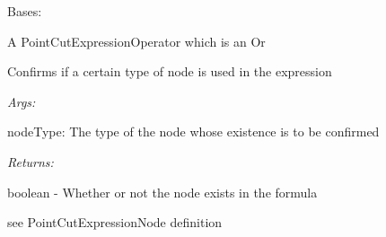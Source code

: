 \documentclass[letterpaper,10pt,english]{sphinxmanual}
\begin{document}
\begin{fulllineitems}
\label{modules/index:aosb.core.PointCutExpressionOr}
Bases: {\hyperref[modules/index:aosb.core.PointCutExpressionOperator]{}}

A PointCutExpressionOperator which is an Or

\begin{fulllineitems}
\label{modules/index:aosb.core.PointCutExpressionOr.expressionUses}
Confirms if a certain type of node is used in the expression

\begin{DUlineblock}{0em}
\item[] \emph{Args:}
\item[]
\begin{DUlineblock}{\DUlineblockindent}
\item[] nodeType: The type of the node whose existence is to be confirmed
\end{DUlineblock}
\end{DUlineblock}

\begin{DUlineblock}{0em}
\item[] \emph{Returns:}
\item[]
\begin{DUlineblock}{\DUlineblockindent}
\item[] boolean - Whether or not the node exists in the formula
\end{DUlineblock}
\end{DUlineblock}

\end{fulllineitems}


\begin{fulllineitems}
\label{modules/index:aosb.core.PointCutExpressionOr.match}
see PointCutExpressionNode definition

\end{fulllineitems}


\begin{fulllineitems}
\label{modules/index:aosb.core.PointCutExpressionOr.numberOfMatchingParts}
\end{fulllineitems}


\end{fulllineitems}
\end{document}
